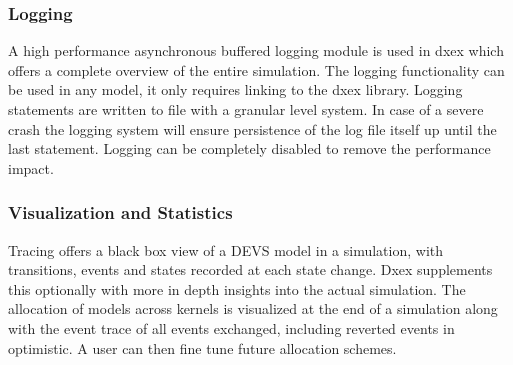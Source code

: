 \subsubsection{Logging}
A high performance asynchronous buffered logging module is used in dxex which offers a complete overview of the entire simulation. The logging functionality can be used in any model, it only requires linking to the dxex library. Logging statements are written to file with a granular level system. In case of a severe crash the logging system will ensure persistence of the log file itself up until the last statement. Logging can be completely disabled to remove the performance impact.
\subsubsection{Visualization and Statistics}
Tracing offers a black box view of a DEVS model in a simulation, with transitions, events and states recorded at each state change. Dxex supplements this optionally with more in depth insights into the actual simulation. 
The allocation of models across kernels is visualized at the end of a simulation along with the event trace of all events exchanged, including reverted events in optimistic. 
A user can then fine tune future allocation schemes. 

